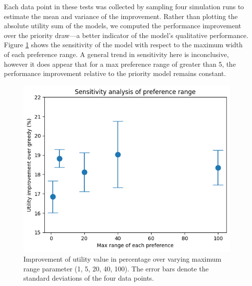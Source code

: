 \documentclass[12pt]{article}
\begin{document}
    Each data point in these tests was collected by sampling four simulation runs to estimate the mean and variance of the improvement. Rather than plotting the absolute utility sum of the models, we computed the performance improvement over the priority draw---a better indicator of the model's qualitative performance. Figure \ref{fig:maxrange} shows the sensitivity of the model with respect to the maximum width of each preference range. A general trend in sensitivity here is inconclusive, however it does appear that for a max preference range of greater than 5, the performance improvement relative to the priority model remains constant.
    \begin{figure}[h]
        \centering
        \captionsetup{width=.7\linewidth}
        \includegraphics[width=0.55\linewidth]{res/range_sensitivity_analysis.png}
        \caption{Improvement of utility value in percentage over varying maximum range parameter (1, 5, 20, 40, 100). The error bars denote the standard deviations of the four data points.}
        \label{fig:maxrange}
    \end{figure}
\end{document}
